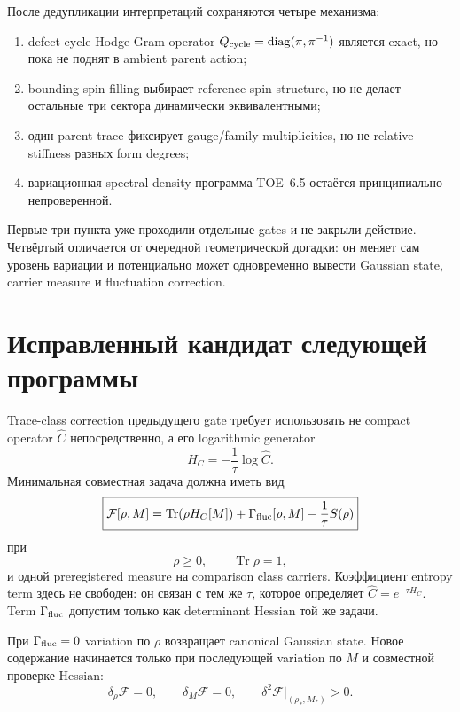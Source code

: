 После дедупликации интерпретаций сохраняются четыре механизма:
\begin{enumerate}
 \item defect-cycle Hodge Gram operator
 \(Q_{\rm cycle}=\operatorname{diag}(\pi,\pi^{-1})\) является exact, но
 пока не поднят в ambient parent action;
 \item bounding spin filling выбирает reference spin structure, но не
 делает остальные три сектора динамически эквивалентными;
 \item один parent trace фиксирует gauge/family multiplicities, но не
 relative stiffness разных form degrees;
 \item вариационная spectral-density программа TOE~6.5 остаётся
 принципиально непроверенной.
\end{enumerate}
Первые три пункта уже проходили отдельные gates и не закрыли действие.
Четвёртый отличается от очередной геометрической догадки: он меняет сам
уровень вариации и потенциально может одновременно вывести Gaussian state,
carrier measure и fluctuation correction.

\section{Исправленный кандидат следующей программы}

Trace-class correction предыдущего gate требует использовать не compact
operator \(\widehat C\) непосредственно, а его logarithmic generator
\begin{equation}
 H_C=-\frac1\tau\log\widehat C.
\end{equation}
Минимальная совместная задача должна иметь вид
\begin{equation}
 \boxed{
 \mathcal F[\rho,M]
 =\operatorname{Tr}(\rho H_C[M])
 +\Gamma_{\rm fluc}[\rho,M]
 -\frac1\tau S(\rho)}
 \label{eq:retrospective-parent-functional}
\end{equation}
при
\begin{equation}
 \rho\geq0,
 \qquad
 \operatorname{Tr}\rho=1,
\end{equation}
и одной preregistered measure на comparison class carriers. Коэффициент
entropy term здесь не свободен: он связан с тем же \(\tau\), которое
определяет \(\widehat C=e^{-\tau H_C}\). Term
\(\Gamma_{\rm fluc}\) допустим только как determinant Hessian той же задачи.

При \(\Gamma_{\rm fluc}=0\) variation по \(\rho\) возвращает canonical
Gaussian state. Новое содержание начинается только при последующей variation
по \(M\) и совместной проверке Hessian:
\begin{equation}
 \delta_\rho\mathcal F=0,
 \qquad
 \delta_M\mathcal F=0,
 \qquad
 \delta^2\mathcal F\big|_{(\rho_*,M_*)}>0.
\end{equation}

